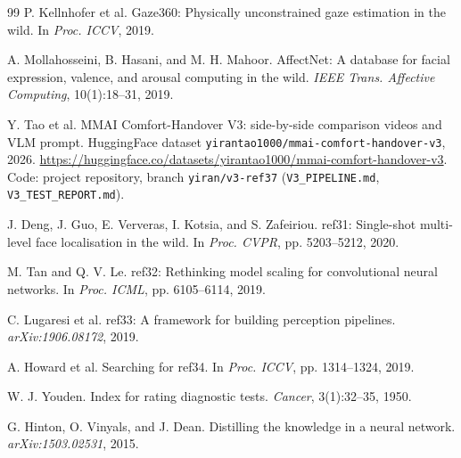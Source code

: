 \documentclass{article}
\newcommand{\code}[1]{\texttt{\small #1}}
\begin{document}
\begin{thebibliography}{99}
 P. Kellnhofer et al. Gaze360: Physically unconstrained gaze estimation in the wild. In \emph{Proc. ICCV}, 2019.

 A. Mollahosseini, B. Hasani, and M. H. Mahoor. AffectNet: A database for facial expression, valence, and arousal computing in the wild. \emph{IEEE Trans. Affective Computing}, 10(1):18--31, 2019.



 Y. Tao et al. MMAI Comfort-Handover V3: side-by-side comparison videos and VLM prompt. HuggingFace dataset \code{yirantao1000/mmai-comfort-handover-v3}, 2026. \url{https://huggingface.co/datasets/yirantao1000/mmai-comfort-handover-v3}. Code: project repository, branch \code{yiran/v3-ref37} (\code{V3\_PIPELINE.md}, \code{V3\_TEST\_REPORT.md}).


 J. Deng, J. Guo, E. Ververas, I. Kotsia, and S. Zafeiriou. ref31: Single-shot multi-level face localisation in the wild. In \emph{Proc. CVPR}, pp. 5203--5212, 2020.

 M. Tan and Q. V. Le. ref32: Rethinking model scaling for convolutional neural networks. In \emph{Proc. ICML}, pp. 6105--6114, 2019.

 C. Lugaresi et al. ref33: A framework for building perception pipelines. \emph{arXiv:1906.08172}, 2019.

 A. Howard et al. Searching for ref34. In \emph{Proc. ICCV}, pp. 1314--1324, 2019.


 W. J. Youden. Index for rating diagnostic tests. \emph{Cancer}, 3(1):32--35, 1950.

 G. Hinton, O. Vinyals, and J. Dean. Distilling the knowledge in a neural network. \emph{arXiv:1503.02531}, 2015.


\end{thebibliography}
\end{document}
